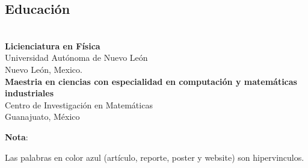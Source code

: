 \documentclass[a3paper]{adcv_color}
\begin{document}
\begin{multicols}{2}
      \section{Educación}\\

      \textbf{Licienciatura en Física} \\
      Universidad Autónoma de Nuevo León\\
      Nuevo León, Mexico.\\

      \textbf{Maestria en ciencias con especialidad en computación y matemáticas industriales}\\
      Centro de Investigación en Matemáticas\\
      Guanajuato, México
      \begin{flushright}

        \changefontsizes{10pt}
        \textbf{Nota}:

        Las palabras en color azul (artículo, reporte, poster y website) son hipervinculos.
      \end{flushright}
    \end{multicols}
    
\end{document}
